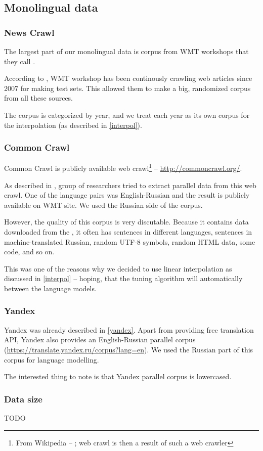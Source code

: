 \subsection{Monolingual data}
\subsubsection{News Crawl}
The largest part of our monolingual data is corpus from WMT workshops that they call .

According to \cite{wmt_findings_2009}, WMT workshop has been continously crawling web articles since 2007 for making test sets. This allowed them to make a big, randomized corpus from all these sources.

The corpus is categorized by year, and we treat each year as its own corpus for the interpolation (as described in \ref{interpol}).
\subsubsection{Common Crawl}
Common Crawl is publicly available web crawl\footnote{From Wikipedia -- ; web crawl is then a result of such a web crawler} -- \url{http://commoncrawl.org/}.

As described in \cite{commoncrawl}, group of researchers tried to extract parallel data from this web crawl. One of the language pairs was English-Russian and the result is publicly available on WMT site. We used the Russian side of the corpus.

However, the quality of this corpus is very discutable. Because it contains data downloaded from the , it often has sentences in different languages, sentences in machine-translated Russian, random UTF-8 symbols, random HTML data, some code, and so on.

This was one of the reasons why we decided to use linear interpolation as discussed in \ref{interpol} -- hoping, that the tuning algorithm will automatically  between the language models.

\subsubsection{Yandex}
Yandex was already described in \ref{yandex}. Apart from providing free translation API, Yandex also provides an English-Russian parallel corpus (\url{https://translate.yandex.ru/corpus?lang=en}). We used the Russian part of this corpus for language modelling.

The interested thing to note is that Yandex parallel corpus is lowercased.

\subsubsection{Data size}

TODO
